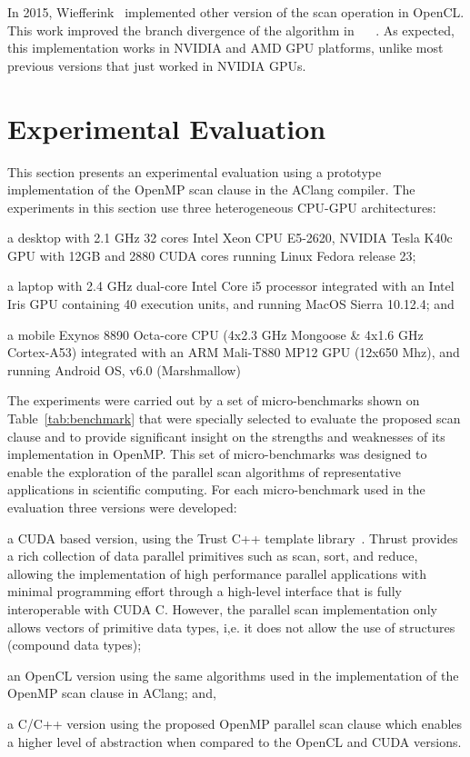 \documentclass[Ingles]{ic-tese-v1}
\begin{document}
In 2015, Wiefferink~\cite{ScanOpenCL} implemented other version of the
scan operation in OpenCL.  This work improved the branch divergence of
the  algorithm in  ~\cite{ScanAsPrimitive} ~\cite{harris2007parallel}.
As  expected,  this  implementation  works   in  NVIDIA  and  AMD  GPU
platforms, unlike  most previous versions  that just worked  in NVIDIA
GPUs.


\chapter{Experimental Evaluation}
\label{cap:Experiments}

This  section presents  an experimental  evaluation using  a prototype
implementation of  the OpenMP scan  clause in the AClang compiler.
The  experiments in this section  use  three   heterogeneous  CPU-GPU
architectures:
\begin{inparaenum}[(i)\upshape]
	\item a desktop with 2.1 GHz 32 cores Intel Xeon CPU E5-2620,
	NVIDIA Tesla K40c GPU with 12GB and 2880 CUDA cores  running
	Linux Fedora  release 23;
	\item  a  laptop  with  2.4  GHz dual-core  Intel  Core  i5  processor
	integrated with an Intel Iris GPU containing 40 execution units, and
	running MacOS Sierra 10.12.4; and
	\item a mobile  Exynos 8890 Octa-core  CPU (4x2.3 GHz Mongoose  \& 4x1.6
	GHz Cortex-A53)  integrated with an  ARM Mali-T880 MP12  GPU (12x650
	Mhz), and running Android OS, v6.0 (Marshmallow)
\end{inparaenum}

The experiments were carried out by a set of micro-benchmarks
shown on  Table~\ref{tab:benchmark} that were specially selected to  evaluate
the  proposed scan clause  and to  provide significant
insight on the strengths and weaknesses of its  implementation in OpenMP.
This set of  micro-benchmarks was designed to  enable the exploration
of  the  parallel scan  algorithms  of  representative applications  in
scientific computing.  For each micro-benchmark  used  in   the  evaluation
three  versions  were developed:
\begin{inparaenum}[(i)\upshape]
	\item a CUDA based version, using the Trust C++ template library~\cite{trust}.
	Thrust provides a  rich collection of data  parallel primitives such
	as scan,  sort, and reduce,  allowing the implementation of  high performance
	parallel  applications with  minimal  programming  effort through  a
	high-level  interface   that  is   fully  interoperable   with  CUDA
	C. However, the parallel scan  implementation only allows vectors of
	primitive  data  types, i,e.   it  does  not  allow the  use  of
	structures (compound data types);
	\item an  OpenCL version using the same algorithms used in the
	implementation of the OpenMP scan clause in AClang; and,
	\item a C/C++ version using the proposed OpenMP parallel scan clause
	which enables a  higher level of abstraction when compared to the OpenCL and
	CUDA versions.
\end{inparaenum}
\end{document}

